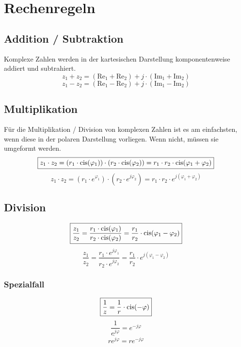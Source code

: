 \section{Rechenregeln}

\subsection{Addition / Subtraktion}
Komplexe Zahlen werden in der kartesischen Darstellung komponentenweise addiert 
und subtrahiert. 
\[ \boxed{z_1 + z_2 = (\text{Re}_1 + \text{Re}_2) + j\cdot (\text{Im}_1 + \text{Im}_2) } \]
\[ \boxed{z_1 - z_2 = (\text{Re}_1 - \text{Re}_2) + j\cdot (\text{Im}_1 - \text{Im}_2) } \]

\subsection{Multiplikation}
Für die Multiplikation / Division von komplexen Zahlen ist es am einfachsten, 
wenn diese in der polaren Darstellung vorliegen. Wenn nicht, müssen sie 
umgeformt werden. 
\[ \boxed{z_1 \cdot z_2 
= (r_1 \cdot \operatorname{cis}(\varphi_1)) \cdot (r_2 \cdot \operatorname{cis}(\varphi_2)) 
= r_1 \cdot r_2 \cdot \operatorname{cis}(\varphi_1 + \varphi_2)} \]
\[ \boxed{z_1 \cdot z_2 
= (r_1 \cdot e^{\varphi_1}) \cdot (r_2 \cdot e^{j \varphi_2}) 
= r_1 \cdot r_2 \cdot e^{j (\varphi_1 + \varphi_2)}} \]

\subsection{Division}
\[ \boxed{\frac{z_1}{z_2} 
= \frac{r_1 \cdot \operatorname{cis}(\varphi_1)}{r_2 \cdot \operatorname{cis}(\varphi_2)}
= \frac{r_1}{r_2} \cdot \operatorname{cis}(\varphi_1 - \varphi_2)} \]
\[ \boxed{\frac{z_1}{z_2} 
= \frac{r_1 \cdot e^{j \varphi_1}}{r_2 \cdot e^{j \varphi_2}}
= \frac{r_1}{r_2} \cdot e^{j (\varphi_1 - \varphi_2)}} \]

\subsubsection{Spezialfall}
\[ \boxed{\frac{1}{z} = \frac{1}{r} \cdot \operatorname{cis}(-\varphi)} \]
\[ \boxed{\frac{1}{e^{j \varphi}} = e^{-j\varphi}} \]
\[ \boxed{\overline{r e^{j\varphi}} = r e^{-j\varphi}} \]

